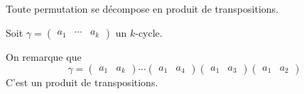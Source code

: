\begin{thm}
	Toute permutation se décompose en produit de transpositions.
\end{thm}

\begin{prv}
	Soit $\gamma = \begin{pmatrix}
		a_1&\cdots&a_k
	\end{pmatrix}$ un $k$-cycle.

	On remarque que
	\[
		\gamma = \begin{pmatrix}
			a_1&a_k
		\end{pmatrix} \cdots \begin{pmatrix}
			a_1&a_4
		\end{pmatrix} \begin{pmatrix}
			a_1&a_3
		\end{pmatrix} \begin{pmatrix}
			a_1&a_2
		\end{pmatrix}
	\] C'est un produit de transpositions.
\end{prv}

